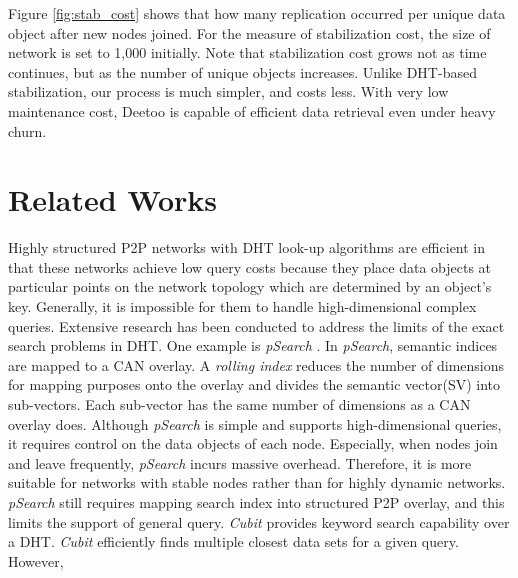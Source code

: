 \documentclass[conference]{IEEEtran}
\begin{document}
Figure \ref{fig:stab_cost} shows that how many replication occurred per unique
data object after new nodes joined. 
For the measure of stabilization cost, 
the size of network is set to 1,000 initially. 
Note that stabilization cost grows not as time continues, but as the number of unique 
objects increases.
Unlike DHT-based stabilization, our process is much simpler, and costs less.
With very low maintenance cost, Deetoo is capable of efficient data retrieval 
even under heavy churn.

\section{Related Works}
\label{sec:related_works}
Highly structured P2P networks with DHT look-up algorithms 
\cite{is:Chord, sr:CAN, bz:Tapestry, pr:Symphony} 
are efficient in that these networks achieve low query costs  
because they place data objects at particular points on the network topology
which are determined by an object's key. 
Generally, it is impossible for them to handle
high-dimensional complex queries.  Extensive research has been conducted 
to address the limits of the exact search problems in DHT.
One example is \emph{pSearch} \cite{psearch}.
In \emph{pSearch}, semantic indices are mapped to a CAN overlay. 
A \emph{rolling index} reduces the number of dimensions for mapping purposes 
onto the overlay and divides the semantic vector(SV) into sub-vectors. 
Each sub-vector has the same number of dimensions as a CAN overlay does.
Although \emph{pSearch} is simple and supports high-dimensional queries, 
it requires control on the data objects of each node. Especially, when 
nodes join and leave frequently, \emph{pSearch} incurs massive overhead.
Therefore, it is more suitable for networks with stable nodes rather than
for highly dynamic networks.
\emph{pSearch} still requires mapping search index into structured P2P overlay, and
this limits the support of general query.
\emph{Cubit}\cite{cubit} provides keyword search capability over a DHT. \emph{Cubit} 
efficiently finds multiple closest data sets for a given query. However, 
\end{document}
